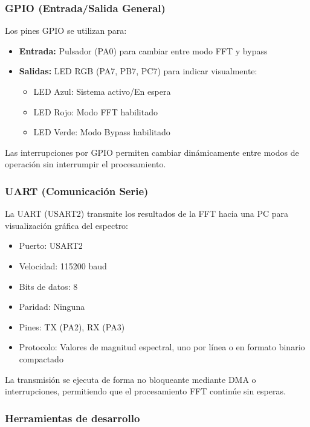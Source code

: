 \documentclass[12pt]{article}
\begin{document}
			\subsubsection{GPIO (Entrada/Salida General)}

				Los pines GPIO se utilizan para:

				\begin{itemize}
					\item \textbf{Entrada:} Pulsador (PA0) para cambiar entre modo FFT y bypass
					\item \textbf{Salidas:} LED RGB (PA7, PB7, PC7) para indicar visualmente:
					\begin{itemize}
						\item LED Azul: Sistema activo/En espera
						\item LED Rojo: Modo FFT habilitado
						\item LED Verde: Modo Bypass habilitado
					\end{itemize}
				\end{itemize}

				Las interrupciones por GPIO permiten cambiar dinámicamente entre modos de operación sin interrumpir el procesamiento.

			\subsubsection{UART (Comunicación Serie)}

				La UART (USART2) transmite los resultados de la FFT hacia una PC para visualización gráfica del espectro:

				\begin{itemize}
					\item Puerto: USART2
					\item Velocidad: 115200 baud
					\item Bits de datos: 8
					\item Paridad: Ninguna
					\item Pines: TX (PA2), RX (PA3)
					\item Protocolo: Valores de magnitud espectral, uno por línea o en formato binario compactado
				\end{itemize}

				La transmisión se ejecuta de forma no bloqueante mediante DMA o interrupciones, permitiendo que el procesamiento FFT continúe sin esperas.

			\subsubsection{Herramientas de desarrollo}
\end{document}
